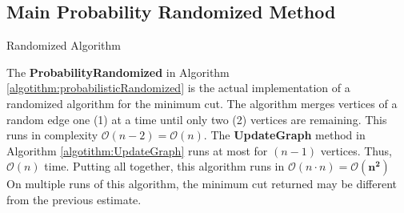 \documentclass[longpaper, english, final, times]{revdetua}
\begin{document}
		
		\subsection{Main Probability Randomized Method}
			\begin{algorithm}[h]
				\caption{Randomized Algorithm}
				\label{algotithm:probabilisticRandomized}
				\DontPrintSemicolon
				
				
				
				
			\end{algorithm}
			
			The \textbf{ProbabilityRandomized} in Algorithm \ref{algotithm:probabilisticRandomized} is the actual implementation of a randomized algorithm for the minimum cut. The algorithm merges vertices of a random edge one (1) at a time until only two (2) vertices are remaining. This runs in complexity $\mathcal{O}(n-2)=\mathcal{O}(n)$. The \textbf{UpdateGraph} method in Algorithm \ref{algotithm:UpdateGraph} runs at most for $(n-1)$ vertices. Thus, $\mathcal{O}(n)$ time. Putting all together, this algorithm runs in $\mathcal{O}(n\cdot n)=\mathbf{\mathcal{O}(n^2)}$\\
			
			On multiple runs of this algorithm, the minimum cut returned may be different from the previous estimate.\\
		
\end{document}

